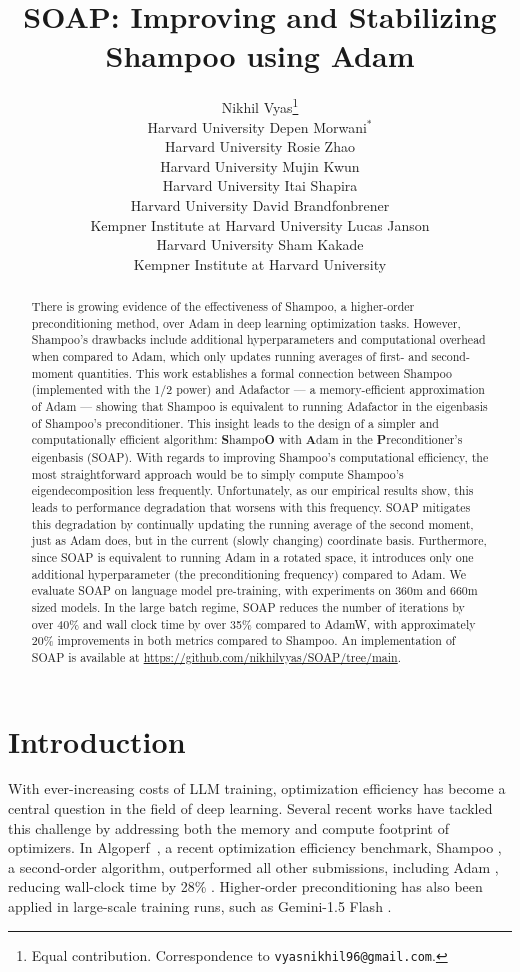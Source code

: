 \documentclass{article} %
\title{SOAP: Improving and Stabilizing Shampoo using Adam}
\author{
Nikhil Vyas\thanks{Equal contribution. Correspondence to \texttt{vyasnikhil96@gmail.com}.}\\
Harvard University
\And
Depen Morwani$^*$\\
Harvard University
\And
Rosie Zhao\\
Harvard University
\And
Mujin Kwun\\
Harvard University
\And
Itai Shapira\\
Harvard University
\And
David Brandfonbrener\\
Kempner Institute at Harvard University
\And
Lucas Janson\\
Harvard University
\And 
Sham Kakade\\
Kempner Institute at Harvard University
}
\begin{document}
\maketitle

\begin{abstract}
There is growing evidence of the effectiveness of Shampoo, a higher-order preconditioning method, over Adam in deep learning optimization tasks. However, Shampoo's drawbacks include additional hyperparameters and computational overhead when compared to Adam, which only updates running averages of first- and second-moment quantities. This work establishes a formal connection between Shampoo (implemented with the 1/2 power) and Adafactor --- a memory-efficient approximation of Adam --- showing that Shampoo is equivalent to running Adafactor in the eigenbasis of Shampoo's preconditioner. This insight leads to the design of a simpler and computationally efficient algorithm: \textbf{S}hampo\textbf{O} with \textbf{A}dam in the \textbf{P}reconditioner's eigenbasis (SOAP).
With regards to improving Shampoo's computational efficiency, the most straightforward approach would be to simply compute Shampoo's eigendecomposition less frequently. 
Unfortunately, as our empirical results show, this leads to performance degradation that worsens with this frequency.
SOAP mitigates this degradation by continually updating the running average of the second moment, just as Adam does, but in the current (slowly changing) coordinate basis. Furthermore, since SOAP is equivalent to running Adam in a rotated space, it introduces only one additional hyperparameter (the preconditioning frequency) compared to Adam. We evaluate SOAP on language model pre-training, with experiments on 360m and 660m sized models. In the large batch regime, SOAP reduces the number of iterations by over 40\% and wall clock time by over 35\% compared to AdamW, with approximately 20\% improvements in both metrics compared to Shampoo. An implementation of SOAP is available at \url{https://github.com/nikhilvyas/SOAP/tree/main}.%
\end{abstract}


\section{Introduction}

With ever-increasing costs of LLM training, optimization efficiency has become a central question in the field of deep learning. Several recent works have tackled this challenge by addressing both the memory \citep{galore, 4bitshampoo} and compute \citep{anil2020scalable} footprint of optimizers. In Algoperf~\citep{dahl2023benchmarking}, a recent optimization efficiency benchmark, Shampoo \citep{gupta2018shampoo}, a second-order algorithm, outperformed all other submissions, including Adam \citep{adam}, reducing wall-clock time by 28\% \citep{algoperfresults}. Higher-order preconditioning has also been applied in large-scale training runs, such as Gemini-1.5 Flash \citep{gemini15}.
\end{document}
